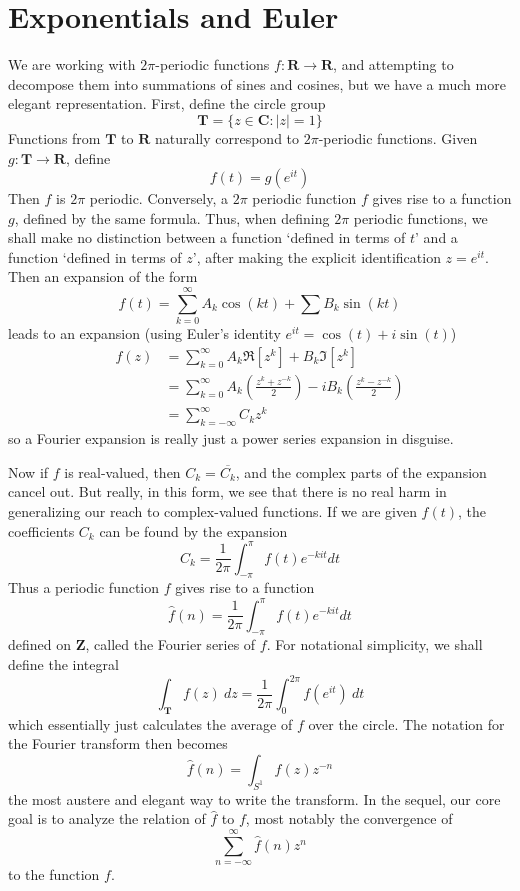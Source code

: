 \section{Exponentials and Euler}

We are working with $2 \pi$-periodic functions $f: \mathbf{R} \to \mathbf{R}$, and attempting to decompose them into summations of sines and cosines, but we have a much more elegant representation. First, define the circle group
%
\[ \mathbf{T} = \{ z \in \mathbf{C} : |z| = 1 \} \]
%
Functions from $\mathbf{T}$ to $\mathbf{R}$ naturally correspond to $2 \pi$-periodic functions. Given $g: \mathbf{T} \to \mathbf{R}$, define
%
\[ f(t) = g(e^{it}) \]
%
Then $f$ is $2\pi$ periodic. Conversely, a $2\pi$ periodic function $f$ gives rise to a function $g$, defined by the same formula. Thus, when defining $2\pi$ periodic functions, we shall make no distinction between a function `defined in terms of $t$' and a function `defined in terms of $z$', after making the explicit identification $z = e^{it}$. Then an expansion of the form
%
\[ f(t) = \sum_{k = 0}^\infty A_k \cos(kt) + \sum B_k \sin(kt) \]
%
leads to an expansion (using Euler's identity $e^{it} = \cos(t) + i \sin(t)$)
%
\begin{align*}
    f(z) &= \sum_{k = 0}^\infty A_k \Re[z^k] + B_k \Im[z^k]\\
    &= \sum_{k = 0}^\infty A_k \left( \frac{z^k + z^{-k}}{2} \right) - i B_k \left( \frac{z^k - z^{-k}}{2} \right)\\&= \sum_{k = -\infty}^\infty C_k z^k
\end{align*}
%
so a Fourier expansion is really just a power series expansion in disguise.

Now if $f$ is real-valued, then $C_k = \overline{C_k}$, and the complex parts of the expansion cancel out. But really, in this form, we see that there is no real harm in generalizing our reach to complex-valued functions. If we are given $f(t)$, the coefficients $C_k$ can be found by the expansion
%
\[ C_k = \frac{1}{2\pi} \int_{-\pi}^\pi f(t) e^{-kit} dt \]
%
Thus a periodic function $f$ gives rise to a function
%
\[ \hat{f}(n) = \frac{1}{2\pi} \int_{-\pi}^\pi f(t) e^{-kit} dt \]
%
defined on $\mathbf{Z}$, called the Fourier series of $f$. For notational simplicity, we shall define the integral
%
\[ \int_{\mathbf{T}} f(z)\ dz = \frac{1}{2\pi} \int_0^{2\pi} f(e^{it})\ dt \]
%
which essentially just calculates the average of $f$ over the circle. The notation for the Fourier transform then becomes
%
\[ \hat{f}(n) = \int_{S^1} f(z) z^{-n} \]
%
the most austere and elegant way to write the transform. In the sequel, our core goal is to analyze the relation of $\hat{f}$ to $f$, most notably the convergence of
%
\[ \sum_{n = -\infty}^\infty \hat{f}(n) z^n \]
%
to the function $f$.

